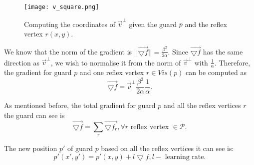 \begin{figure}[h!]
    \centering
    \texttt{[image: v\_square.png]}
    \caption{Computing the coordinates of $\vec v^\perp$ given the guard $p$ and the reflex vertex $r(x, y)$.}
    \label{fig:vsquare}
\end{figure}

We know that the norm of the gradient is $||\vec{\bigtriangledown f}|| = \frac{\beta^2}{2\alpha}$. Since $\vec{\bigtriangledown f}$ has the same direction as $\vec v^\perp$, we wish to normalise it from the norm of $\vec v^\perp$ with $\frac 1 \alpha$. Therefore, the gradient for guard $p$ and one reflex vertex $r \in Vis(p)$ can be computed as $$\vec{\bigtriangledown f} = \vec v^\perp \frac{\beta^2}{2\alpha} \frac 1 \alpha.$$

As mentioned before, the total gradient for guard $p$ and all the reflex vertices $r$ the guard can see is $$\vec{\bigtriangledown f} = \sum_r \vec{\bigtriangledown f_r}, \forall r \text{ reflex vertex } \in \mathcal P.$$

The new position $p'$ of guard $p$ based on all the reflex vertices it can see is: $$p'(x', y') = p'(x, y) + l\bigtriangledown f, l - \text{ learning rate}.$$





    

    

